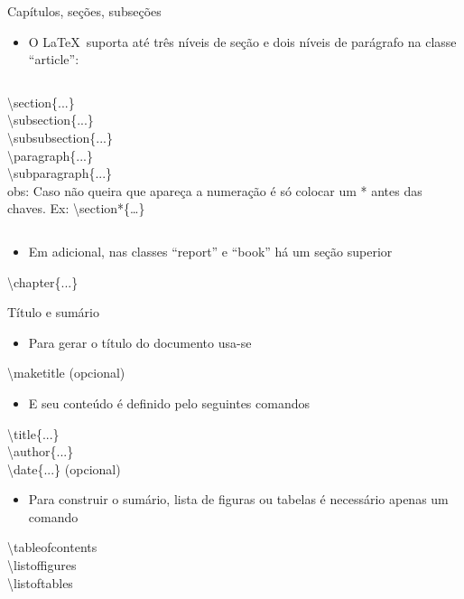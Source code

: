 \begin{frame}{Capítulos, seções, subseções}
    \begin{itemize}
    \item O \LaTeX\ suporta até três níveis de seção e dois níveis de parágrafo na classe ``article'':
    \end{itemize}
   
    \begin{columns}
    \alert{\quad \textbackslash section\{...\} \\
           \quad \textbackslash subsection\{...\} \\
           \quad \textbackslash subsubsection\{...\} \\
           \quad \textbackslash paragraph\{...\} \\
           \quad \textbackslash subparagraph\{...\} \\
        }
    \small
    obs: Caso não queira que apareça a numeração é só colocar um * antes das chaves. Ex: \textbackslash section*\{\dots\}
    \end{columns}

    \begin{itemize}
    \item Em adicional, nas classes ``report'' e ``book'' há um seção superior
    \end{itemize}

    \alert{\textbackslash chapter\{...\}}
\end{frame}

\begin{frame}{Título e sumário}
    \begin{itemize}
    \item Para gerar o título do documento usa-se
    \end{itemize}

   \alert{\textbackslash maketitle} (opcional)

    \begin{itemize}
    \item E seu conteúdo é definido pelo seguintes comandos
    \end{itemize}

    \alert{\textbackslash title\{...\}} \\
    \alert{\textbackslash author\{...\}} \\
    \alert{\textbackslash date\{...\}} {\small (opcional)}

    \begin{itemize}
    \item Para construir o sumário, lista de figuras ou tabelas é necessário apenas um comando
    \end{itemize}
    
    \alert{\textbackslash tableofcontents \\
           \textbackslash listoffigures \\
           \textbackslash listoftables
        }

\end{frame}

